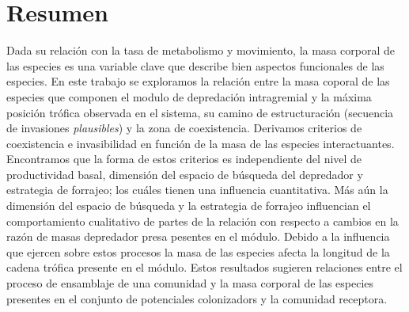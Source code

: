 \section{Resumen}
Dada su relaci\'on con la tasa de metabolismo y movimiento, la masa corporal de las especies es una variable clave que describe bien aspectos funcionales de las especies. En este trabajo se exploramos la relaci\'on entre la masa coporal de las especies que componen el modulo de depredaci\'on intragremial y la m\'axima posici\'on tr\'ofica observada en el sistema, su camino de estructuraci\'on (secuencia de invasiones \emph{plausibles}) y la zona de coexistencia. Derivamos criterios de coexistencia e invasibilidad en funci\'on de la masa de las especies interactuantes. Encontramos que la forma de estos criterios es independiente del nivel de productividad basal, dimensi\'on del espacio de b\'usqueda del depredador y estrategia de forrajeo; los cu\'ales tienen una influencia cuantitativa. M\'as a\'un la dimensi\'on del espacio de b\'usqueda y la estrategia de forrajeo influencian el comportamiento cualitativo de partes de la relaci\'on con respecto a cambios en la raz\'on de masas depredador presa pesentes en el m\'odulo. Debido a la influencia que ejercen sobre estos procesos la masa de las especies afecta la longitud de la cadena tr\'ofica presente en el m\'odulo. Estos resultados sugieren relaciones entre el proceso de ensamblaje de una comunidad y la masa corporal de las especies presentes en el conjunto de potenciales colonizadors y la comunidad receptora.


